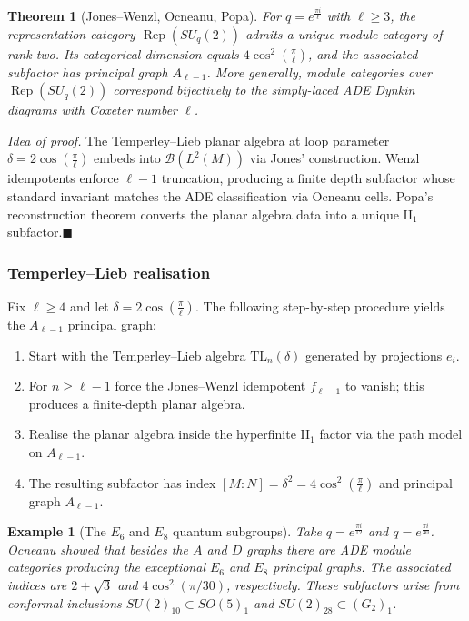 \documentclass[11pt, a4paper]{article}
\theoremstyle{colored_def}
\theoremstyle{colored_thm}
\newtheorem{theorem}{Theorem}[section]
\theoremstyle{colored_ex}
\newtheorem{example}{Example}[section]
\begin{document}
\begin{theorem}[Jones--Wenzl, Ocneanu, Popa]\label{thm:jones-wenzl}
For $q = e^{\frac{\pi i}{\ell}}$ with $\ell \geq 3$, the representation category $\operatorname{Rep}(SU_q(2))$ admits a unique module category of rank two. Its categorical dimension equals $4 \cos^2\!\left(\frac{\pi}{\ell}\right)$, and the associated subfactor has principal graph $A_{\ell-1}$. More generally, module categories over $\operatorname{Rep}(SU_q(2))$ correspond bijectively to the simply-laced ADE Dynkin diagrams with Coxeter number $\ell$.
\end{theorem}

\noindent\textit{Idea of proof.}
The Temperley--Lieb planar algebra at loop parameter $\delta = 2 \cos\left(\frac{\pi}{\ell}\right)$ embeds into $\mathcal{B}(L^2(M))$ via Jones' construction. Wenzl idempotents enforce $\ell - 1$ truncation, producing a finite depth subfactor whose standard invariant matches the ADE classification via Ocneanu cells. Popa's reconstruction theorem converts the planar algebra data into a unique II$_1$ subfactor.\hfill$\blacksquare$

\subsubsection{Temperley--Lieb realisation}

Fix $\ell \geq 4$ and let $\delta = 2\cos\left(\frac{\pi}{\ell}\right)$. The following step-by-step procedure yields the $A_{\ell-1}$ principal graph:
\begin{enumerate}
    \item Start with the Temperley--Lieb algebra $\mathrm{TL}_n(\delta)$ generated by projections $e_i$.
    \item For $n \geq \ell - 1$ force the Jones--Wenzl idempotent $f_{\ell-1}$ to vanish; this produces a finite-depth planar algebra.
    \item Realise the planar algebra inside the hyperfinite II$_1$ factor via the path model on $A_{\ell-1}$.
    \item The resulting subfactor has index $[M:N] = \delta^2 = 4\cos^2\!\left(\frac{\pi}{\ell}\right)$ and principal graph $A_{\ell-1}$.
\end{enumerate}

\begin{example}[The $E_6$ and $E_8$ quantum subgroups]\label{ex:exceptional-quantum-subgroup}
Take $q = e^{\frac{\pi i}{12}}$ and $q = e^{\frac{\pi i}{30}}$. Ocneanu showed that besides the $A$ and $D$ graphs there are ADE module categories producing the exceptional $E_6$ and $E_8$ principal graphs. The associated indices are $2 + \sqrt{3}$ and $4\cos^2(\pi/30)$, respectively. These subfactors arise from conformal inclusions $SU(2)_{10} \subset SO(5)_1$ and $SU(2)_{28} \subset (G_2)_1$.
\end{example}
\end{document}
